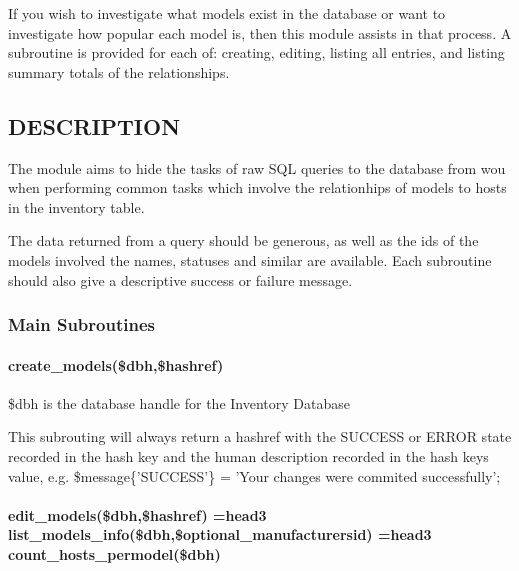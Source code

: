 \documentclass{book}
\begin{document}
If you wish to investigate what models exist in the database or want to investigate how popular each model is, then this module assists in that process. A subroutine is provided for each of: creating, editing, listing all entries, and listing summary totals of the relationships.


\subsection{DESCRIPTION}
\label{Inventory::Models_DESCRIPTION}
\hypertarget{Inventory::Models_DESCRIPTION}{}



The module aims to hide the tasks of raw SQL queries to the database from wou when performing common tasks which involve the relationhips of models to hosts in the inventory table.



The data returned from a query should be generous, as well as the ids of the models involved the names, statuses and similar are available. Each subroutine should also give a descriptive success or failure message.


\subsubsection{Main Subroutines}
\label{Inventory::Models_Main_Subroutines}
\hypertarget{Inventory::Models_Main_Subroutines}{}


\paragraph*{create\protect\_models(\$dbh,\$hashref)}
\label{Inventory::Models_create_models_dbh_hashref_}
\hypertarget{Inventory::Models_create_models_dbh_hashref_}{}



\$dbh is the database handle for the Inventory Database



This subrouting will always return a hashref with the SUCCESS or ERROR state recorded in the hash key and the human description recorded in the hash keys value, e.g. \$message\{'SUCCESS'\} = 'Your changes were commited successfully';


\paragraph*{edit\protect\_models(\$dbh,\$hashref) =head3 list\protect\_models\protect\_info(\$dbh,\$optional\protect\_manufacturersid) =head3 count\protect\_hosts\protect\_permodel(\$dbh)}
\label{Inventory::Models_edit_models_dbh_hashref_head3_list_models_info_dbh_optional_manufacturersid_head3_count_hosts_permodel_dbh_}
\hypertarget{Inventory::Models_edit_models_dbh_hashref_head3_list_models_info_dbh_optional_manufacturersid_head3_count_hosts_permodel_dbh_}{}
\end{document}

